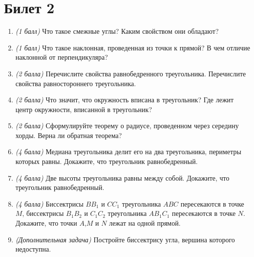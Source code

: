 \documentclass[12pt, a4paper]{article}
\begin{document}
\section*{Билет 2}
\begin{enumerate}
	\item \textit{(1 балл)} Что такое смежные углы? Каким свойством они обладают?
	\item \textit{(1 балл)} Что такое наклонная, проведенная из точки к прямой? В чем отличие наклонной от перпендикуляра?
	\item \textit{(2 балла)} Перечислите свойства равнобедренного треугольника. Перечислите свойства равностороннего треугольника.
	\item \textit{(2 балла)} Что значит, что окружность вписана в треугольник? Где лежит центр окружности, вписанной в треугольник?
	\item \textit{(2 балла)} Сформулируйте теорему о радиусе, проведенном через середину хорды. Верна ли обратная теорема?
	\item \textit{(4 балла)} Медиана треугольника делит его на два треугольника, периметры которых равны. Докажите, что треугольник равнобедренный.
	\item \textit{(4 балла)} Две высоты треугольника равны между собой. Докажите, что треугольник равнобедренный.
	\item \textit{(4 балла)} Биссектрисы $BB_1$ и $CC_1$ треугольника $ABC$ пересекаются в точке $M$, биссектрисы $B_1B_2$ и $C_1C_2$ треугольника $AB_1C_1$
	пересекаются в точке $N$. Докажите, что точки $A$,$ M$ и $N$ лежат на одной прямой.
	\item \textit{(Дополнительная задача)} Постройте биссектрису угла, вершина которого недоступна.
\end{enumerate}
\end{document}
